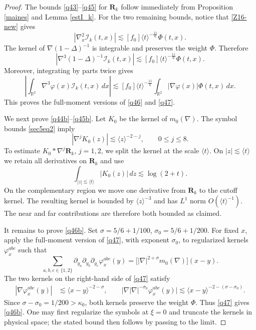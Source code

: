 \documentclass[reqno,11pt]{amsart}
\numberwithin{equation}{section}
\begin{document}
\begin{proof}
The bounds \eqref{q43}--\eqref{q45} for $\mathbf R_k$ follow immediately
from Proposition \ref{maines} and Lemma \ref{estI_k}. For the two remaining
bounds, notice that \eqref{Z16-new} gives
\[
|\nabla_x^2\mathcal I_k(t,x)|
\lesssim [f_0]\langle t\rangle^{-\frac{11}{6}}\Phi(t,x).
\]
The kernel of $\nabla(1-\Delta)^{-1}$ is integrable and preserves the
weight $\Phi$. Therefore
\[
|\nabla^3(1-\Delta)^{-1}\mathcal I_k(t,x)|
\lesssim [f_0]\langle t\rangle^{-\frac{11}{6}}\Phi(t,x).
\]
Moreover, integrating by parts twice gives
\[
\left|\int_{\mathbb R^2}\nabla^3\varphi(x)\mathcal I_k(t,x)\,dx\right|
\lesssim [f_0]\langle t\rangle^{-\frac{11}{6}}
\int_{\mathbb R^2}|\nabla\varphi(x)|\Phi(t,x)\,dx.
\]
This proves the full-moment versions of \eqref{q46} and \eqref{q47}.

We next prove \eqref{q44b}--\eqref{q45b}. Let $K_0$ be the kernel of
$m_0(\nabla)$. The symbol bounds \eqref{sec5eq2} imply
\[
|\nabla^jK_0(z)|\lesssim\langle z\rangle^{-2-j},
\qquad 0\leq j\leq8.
\]
To estimate $K_0*\nabla^j\mathbf R_k$, $j=1,2$, we split the kernel at
the scale $\langle t\rangle$. On $|z|\lesssim\langle t\rangle$ we retain
all derivatives on $\mathbf R_k$ and use
\[
\int_{|z|\lesssim\langle t\rangle}|K_0(z)|\,dz
\lesssim\log(2+t).
\]
On the complementary region we move one derivative from $\mathbf R_k$
to the cutoff kernel. The resulting kernel is bounded by
$\langle z\rangle^{-3}$ and has $L^1$ norm
$O(\langle t\rangle^{-1})$. The near and far contributions are therefore
both bounded as claimed. 

It remains to prove \eqref{q46b}. Set $\sigma=5/6+1/100$, $\sigma_0=5/6+1/200$. For fixed $x$, apply the full-moment version of \eqref{q47}, with exponent
$\sigma_0$, to regularized kernels $\varphi_x^{abc}$ such that
\[
\sum_{a,b,c\in\{1,2\}}\partial_{y_a}\partial_{y_b}\partial_{y_c}\varphi^{abc}_x(y)
=\big[|\nabla|^{2+\sigma}m_0(\nabla)\big](x-y).
\]
The two kernels on the right-hand side of \eqref{q47} satisfy
\begin{align*}
|\nabla\varphi^{abc}_x(y)|
&\lesssim\langle x-y\rangle^{-2-\sigma},\qquad \big|\nabla|\nabla|^{-\sigma_0}\varphi^{abc}_x(y)\big|\lesssim\langle x-y\rangle^{-2-(\sigma-\sigma_0)}.
\end{align*}
Since $\sigma-\sigma_0=1/200>\kappa_0$, both kernels preserve the weight
$\Phi$. Thus \eqref{q47} gives \eqref{q46b}. One may first regularize the
symbols at $\xi=0$ and truncate the kernels in physical space; the stated
bound then follows by passing to the limit.
\end{proof}
\end{document}
